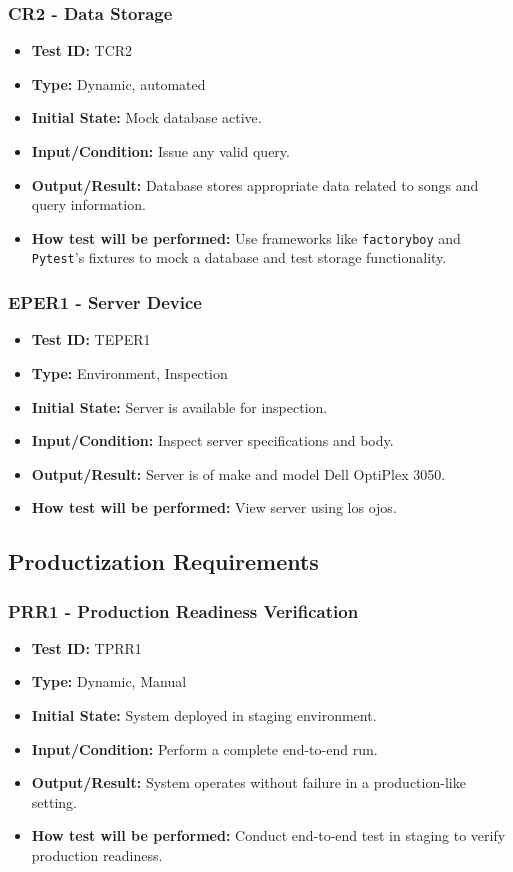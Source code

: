 \documentclass[12pt, titlepage]{article}
\begin{document}
\subsubsection{CR2 - Data Storage}
\begin{itemize}
    \item \textbf{Test ID:} TCR2
    \item \textbf{Type:} Dynamic, automated
    \item \textbf{Initial State:} Mock database active.
    \item \textbf{Input/Condition:} Issue any valid query.
    \item \textbf{Output/Result:} Database stores appropriate data related to songs and query information.
    \item \textbf{How test will be performed:} Use frameworks like \texttt{factoryboy} and \texttt{Pytest}'s fixtures to mock a database and test storage functionality.
\end{itemize}

\subsubsection{EPER1 - Server Device}
\begin{itemize}
    \item \textbf{Test ID:} TEPER1
    \item \textbf{Type:} Environment, Inspection
    \item \textbf{Initial State:} Server is available for inspection.
    \item \textbf{Input/Condition:} Inspect server specifications and body.
    \item \textbf{Output/Result:} Server is of make and model Dell OptiPlex 3050.
    \item \textbf{How test will be performed:} View server using los ojos.
\end{itemize}

\subsection{Productization Requirements}

\subsubsection{PRR1 - Production Readiness Verification}
\begin{itemize}
    \item \textbf{Test ID:} TPRR1
    \item \textbf{Type:} Dynamic, Manual
    \item \textbf{Initial State:} System deployed in staging environment.
    \item \textbf{Input/Condition:} Perform a complete end-to-end run.
    \item \textbf{Output/Result:} System operates without failure in a production-like setting.
    \item \textbf{How test will be performed:} Conduct end-to-end test in staging to verify production readiness.
\end{itemize}
\end{document}
